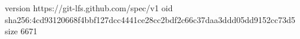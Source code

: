version https://git-lfs.github.com/spec/v1
oid sha256:4cd93120668f4bbf127dcc4441ce28cc2bdf2c66c37daa3ddd05dd9152cc73d5
size 6671
